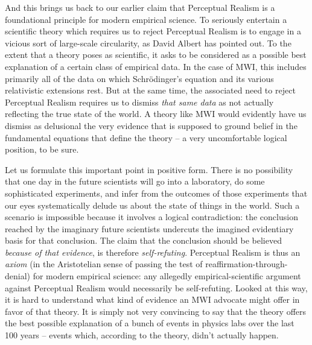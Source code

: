 \documentclass[12pt]{article}
\begin{document}
And this brings us back to our earlier claim that Perceptual Realism
is a foundational principle for modern empirical science.  To
seriously entertain a scientific theory which requires us to reject
Perceptual Realism is to engage in a vicious sort of large-scale 
circularity, as David Albert has pointed out. \cite{albert2} 
To the extent that a
theory poses as scientific, it asks to be considered as a possible
best explanation of a certain class of empirical data.  In the case
of MWI, this includes primarily all of the data on which
Schr\"odinger's equation and its various relativistic extensions  
rest.  But at the same time, the associated need to reject
Perceptual Realism requires us to dismiss \emph{that same data} 
as not actually reflecting the true state of the world.  A theory like
MWI would evidently have us dismiss as delusional the very evidence
that is supposed to ground belief in the fundamental equations that
define the theory -- a very uncomfortable logical position, to be sure.  

Let us formulate this important point in positive form.  There is no 
possibility that one day in the future scientists will go into a 
laboratory, do some sophisticated experiments, and infer from the 
outcomes of those experiments that our eyes systematically delude us
about the state of things in the world.  Such a scenario is impossible
because it involves a logical contradiction:  the conclusion reached
by the imaginary future scientists undercuts the imagined
evidentiary basis for that conclusion.  The claim that the
conclusion should be believed \emph{because of that evidence}, is
therefore \emph{self-refuting}.  
Perceptual Realism is thus an \emph{axiom} (in the Aristotelian sense
of passing the test of reaffirmation-through-denial) for modern 
empirical science:  any allegedly empirical-scientific argument
against Perceptual Realism would necessarily
be self-refuting.  Looked at this
way, it is hard to understand what kind of evidence an MWI advocate might 
offer in favor of that theory.  It is simply not very convincing to 
say that the theory offers the best possible explanation  of a bunch
of events in physics labs over the last 100 years -- events which,
according to the theory, didn't actually happen.
\end{document}
